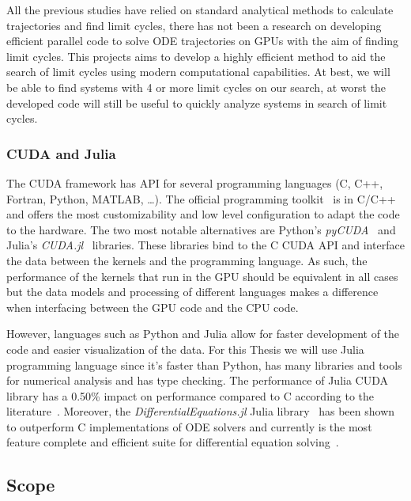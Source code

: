 All the previous studies have relied on standard analytical methods to calculate trajectories and find limit cycles, there has not been a research on developing efficient parallel code to solve ODE trajectories on GPUs with the aim of finding limit cycles. This projects aims to develop a highly efficient method to aid the search of limit cycles using modern computational capabilities. At best, we will be able to find systems with 4 or more limit cycles on our search, at worst the developed code will still be useful to quickly analyze systems in search of limit cycles.

\pagebreak
\subsubsection{CUDA and Julia}

The CUDA framework has API for several programming languages (C, C++, Fortran,
Python, MATLAB, \dots). The official programming toolkit~\cite{nvidia_cuda_2021}
is in C/C++ and offers the most customizability and low level configuration to
adapt the code to the hardware. The two most notable alternatives are Python's
\emph{pyCUDA}~\cite{klockner_pycuda_2012} and Julia's
\emph{CUDA.jl}~\cite{besard_effective_2019} libraries. These libraries bind to
the C CUDA API and interface the data between the kernels and the programming
language. As such, the performance of the kernels that run in the GPU should be
equivalent in all cases but the data models and processing of different
languages makes a difference when interfacing between the GPU code and the CPU
code.

However, languages such as Python and Julia allow for faster development of the
code and easier visualization of the data. For this Thesis we will use Julia
programming language since it's faster than Python, has many libraries and tools
for numerical analysis and has type checking. The performance of Julia CUDA
library has a 0.50\% impact on performance compared to C according to the
literature~\cite{besard_effective_2019}. Moreover, the
\emph{DifferentialEquations.jl} Julia
library~\cite{rackauckas_differentialequationsjl_2017} has been shown to
outperform C implementations of ODE solvers and currently is the most feature
complete and efficient suite for differential equation
solving~\cite{rackauckas_comparison_2017}.

\pagebreak
\subsection{Scope}
